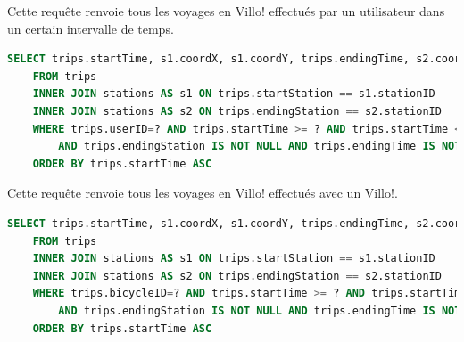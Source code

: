 \documentclass[a4paper,11pt]{report}
\begin{document}
    Cette requ\^ete renvoie tous les voyages en Villo! effectués par un utilisateur dans un certain intervalle de temps.
    \begin{lstlisting}[language=sql]
    SELECT trips.startTime, s1.coordX, s1.coordY, trips.endingTime, s2.coordX, s2.coordY
    FROM trips
    INNER JOIN stations AS s1 ON trips.startStation == s1.stationID
    INNER JOIN stations AS s2 ON trips.endingStation == s2.stationID
    WHERE trips.userID=? AND trips.startTime >= ? AND trips.startTime <= ? 
        AND trips.endingStation IS NOT NULL AND trips.endingTime IS NOT NULL
    ORDER BY trips.startTime ASC
    \end{lstlisting}

    Cette requ\^ete renvoie tous les voyages en Villo! effectués avec un Villo!.
    \begin{lstlisting}[language=sql]
    SELECT trips.startTime, s1.coordX, s1.coordY, trips.endingTime, s2.coordX, s2.coordY
    FROM trips
    INNER JOIN stations AS s1 ON trips.startStation == s1.stationID
    INNER JOIN stations AS s2 ON trips.endingStation == s2.stationID
    WHERE trips.bicycleID=? AND trips.startTime >= ? AND trips.startTime <= ? 
        AND trips.endingStation IS NOT NULL AND trips.endingTime IS NOT NULL
    ORDER BY trips.startTime ASC
    \end{lstlisting}
\end{document}
